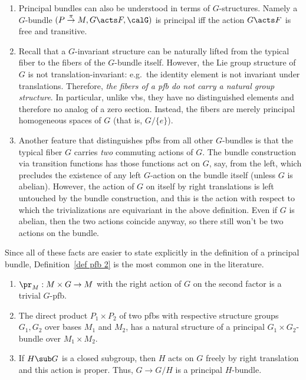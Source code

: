 \begin{rem}
    \begin{enumerate}
        \item Principal bundles can also be understood in terms of $G$-structures. Namely a $G$-bundle $(P\overset{\pi}{\to}M,G\acts F,\calG)$ is principal iff the action $G\acts F$ is free and transitive. 
        
        \item Recall that a $G$-invariant structure can be naturally lifted from the typical fiber to the fibers of the $G$-bundle itself. However, the Lie group structure of $G$ is not translation-invariant: e.g.\ the identity element is not invariant under translations. Therefore, \emph{the fibers of a \gls{pfb} do not carry a natural group structure}. In particular, unlike \glspl{vb}, they have no distinguished elements and therefore no analog of a zero section. Instead, the fibers are merely principal homogeneous spaces of $G$ (that is, $G\slash \{e\}$).

        \item Another feature that distinguishes \glspl{pfb} from all other $G$-bundles is that the typical fiber $G$ carries \emph{two} commuting actions of $G$. The bundle construction via transition functions has those functions act on $G$, say, from the left, which precludes the existence of any left $G$-action on the bundle itself (unless $G$ is abelian). However, the action of $G$ on itself by right translations is left untouched by the bundle construction, and this is the action with respect to which the trivializations are equivariant in the above definition. Even if $G$ is abelian, then the two actions coincide anyway, so there still won't be two actions on the bundle.
    \end{enumerate}
    Since all of these facts are easier to state explicitly in the definition of a principal bundle, Definition~\ref{def pfb 2} is the most common one in the literature.
\end{rem}




\begin{example}
    \begin{enumerate}
        \item $\pr_M:M\times G\to M$ with the right action of $G$ on the second factor is a trivial $G$-\gls{pfb}.
        \item The direct product $P_1\times P_2$ of two \glspl{pfb} with respective structure groups $G_1,G_2$ over bases $M_1$ and $M_2$, has a natural structure of a principal $G_1\times G_2$-bundle over $M_1\times M_2$.
        \item If $H\sub G$ is a closed subgroup, then $H$ acts on $G$ freely by right translation and this action is proper. Thus, $G\to G\slash H$ is a principal $H$-bundle.
    \end{enumerate}
\end{example}

